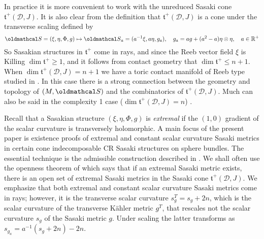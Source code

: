 \documentclass[12pt]{amsart}
\def\bbr{{\mathbb R}}
\def\cald{{\mathcal D}}
\def\cals{{\oldmathcal S}}
\def\gt{{\mathfrak t}}
\begin{document}
In practice it is more convenient to work with the unreduced Sasaki cone $\gt^+(\cald,J)$. It is also clear from the definition that $\gt^+(\cald,J)$ is a cone under the transverse scaling defined by
\begin{equation}\label{transscale}
\cals=(\xi,\eta,\Phi,g)\mapsto \cals_a=(a^{-1}\xi,a\eta,g_a),\quad g_a=ag+(a^2-a)\eta\otimes\eta, \quad a\in\bbr^+
\end{equation}
So Sasakian structures in $\gt^+$ come in rays, and since the Reeb vector field $\xi$ is Killing $\dim\gt^+\geq 1$, and it follows from contact geometry that $\dim\gt^+\leq n+1$. When $\dim\gt^+(\cald,J)=n+1$ we have a toric contact manifold of Reeb type studied in \cite{BM93,BG00b,Ler02a,Ler04,Leg10,Leg16}. In this case there is a strong connection between the geometry and topology of $(M,\cals)$ and the combinatorics of $\gt^+(\cald,J)$. Much can also be said in the complexity 1 case ($\dim\gt^+(\cald,J)=n$) \cite{AlHa06}.

Recall \cite{BGS06} that a Sasakian structure $(\xi,\eta,\Phi,g)$ is {\it extremal} if the $(1,0)$ gradient of the scalar curvature is transversely holomorphic. A main focus of the present paper is existence proofs of extremal and constant scalar curvature Sasaki metrics in certain cone indecomposable CR Sasaki structures on sphere bundles. The essential technique is the admissible construction described in \cite{ACGT08}. We shall often use the openness theorem of \cite{BGS06} which says that if an extremal Sasaki metric exists, there is an open set of extremal Sasaki metrics in the Sasaki cone $\gt^+(\cald,J)$. We emphasize that both extremal and constant scalar curvature Sasaki metrics come in rays; however, it is the transverse scalar curvature $s^T_g=s_g+2n$, which is the scalar curvature of the transverse K\"ahler metric $g^T$, that rescales not the scalar curvature $s_g$ of the Sasaki metric $g$. Under scaling the latter transforms as $s_{g_a}=a^{-1}(s_g+2n)-2n$.
\end{document}
